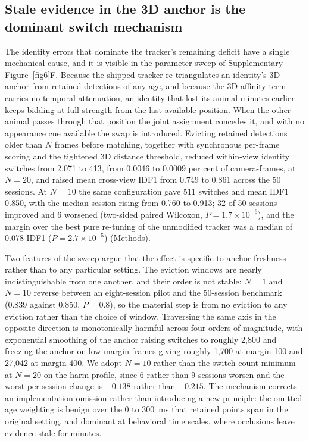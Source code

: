 \documentclass[pdflatex, sn-nature]{sn-jnl}
\theoremstyle{thmstyleone}%
\theoremstyle{thmstyletwo}%
\theoremstyle{thmstylethree}%
\begin{document}
\subsection{Stale evidence in the 3D anchor is the dominant switch mechanism}\label{subsec2-9}

The identity errors that dominate the tracker's remaining deficit have a single mechanical cause, and it is visible in the parameter sweep of Supplementary Figure~\ref{fig6}F. Because the shipped tracker re-triangulates an identity's 3D anchor from retained detections of any age, and because the 3D affinity term carries no temporal attenuation, an identity that lost its animal minutes earlier keeps bidding at full strength from the last available position. When the other animal passes through that position the joint assignment concedes it, and with no appearance cue available the swap is introduced. Evicting retained detections older than $N$ frames before matching, together with synchronous per-frame scoring and the tightened 3D distance threshold, reduced within-view identity switches from 2,071 to 413, from 0.0046 to 0.0009 per cent of camera-frames, at $N = 20$, and raised mean cross-view IDF1 from 0.749 to 0.861 across the 50 sessions. At $N = 10$ the same configuration gave 511 switches and mean IDF1 0.850, with the median session rising from 0.760 to 0.913; 32 of 50 sessions improved and 6 worsened (two-sided paired Wilcoxon, $P = 1.7 \times 10^{-6}$), and the margin over the best pure re-tuning of the unmodified tracker was a median of 0.078 IDF1 ($P = 2.7 \times 10^{-5}$) (Methods).

Two features of the sweep argue that the effect is specific to anchor freshness rather than to any particular setting. The eviction windows are nearly indistinguishable from one another, and their order is not stable: $N = 1$ and $N = 10$ reverse between an eight-session pilot and the 50-session benchmark (0.839 against 0.850, $P = 0.8$), so the material step is from no eviction to any eviction rather than the choice of window. Traversing the same axis in the opposite direction is monotonically harmful across four orders of magnitude, with exponential smoothing of the anchor raising switches to roughly 2,800 and freezing the anchor on low-margin frames giving roughly 1,700 at margin 100 and 27,042 at margin 400. We adopt $N = 10$ rather than the switch-count minimum at $N = 20$ on the harm profile, since 6 rather than 9 sessions worsen and the worst per-session change is $-0.138$ rather than $-0.215$. The mechanism corrects an implementation omission rather than introducing a new principle: the omitted age weighting is benign over the 0 to 300~ms that retained points span in the original setting, and dominant at behavioral time scales, where occlusions leave evidence stale for minutes.
\end{document}
